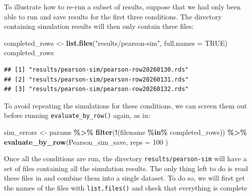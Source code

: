 \documentclass[
]{book}
\newenvironment{Shaded}{\begin{snugshade}}{\end{snugshade}}
\newcommand{\AttributeTok}[1]{\textcolor[rgb]{0.13,0.29,0.53}{#1}}
\newcommand{\ConstantTok}[1]{\textcolor[rgb]{0.56,0.35,0.01}{#1}}
\newcommand{\DecValTok}[1]{\textcolor[rgb]{0.00,0.00,0.81}{#1}}
\newcommand{\FunctionTok}[1]{\textcolor[rgb]{0.13,0.29,0.53}{\textbf{#1}}}
\newcommand{\NormalTok}[1]{#1}
\newcommand{\OtherTok}[1]{\textcolor[rgb]{0.56,0.35,0.01}{#1}}
\newcommand{\SpecialCharTok}[1]{\textcolor[rgb]{0.81,0.36,0.00}{\textbf{#1}}}
\newcommand{\StringTok}[1]{\textcolor[rgb]{0.31,0.60,0.02}{#1}}
\begin{document}
To illustrate how to re-run a subset of results, suppose that we had only been able to run and save results for the first three conditions.
The directory containing simulation results will then only contain three files:

\begin{Shaded}
\begin{Highlighting}[]
\NormalTok{completed\_rows }\OtherTok{\textless{}{-}} \FunctionTok{list.files}\NormalTok{(}\StringTok{"results/pearson{-}sim"}\NormalTok{, }\AttributeTok{full.names =} \ConstantTok{TRUE}\NormalTok{)}
\NormalTok{completed\_rows}
\end{Highlighting}
\end{Shaded}

\begin{verbatim}
## [1] "results/pearson-sim/pearson-row20260130.rds"
## [2] "results/pearson-sim/pearson-row20260131.rds"
## [3] "results/pearson-sim/pearson-row20260132.rds"
\end{verbatim}

To avoid repeating the simulations for these conditions, we can screen them out before running \texttt{evaluate\_by\_row()} again, as in:

\begin{Shaded}
\begin{Highlighting}[]
\NormalTok{sim\_errors }\OtherTok{\textless{}{-}} 
\NormalTok{  params }\SpecialCharTok{\%\textgreater{}\%}
  \FunctionTok{filter}\NormalTok{(}\SpecialCharTok{!}\NormalTok{(filename }\SpecialCharTok{\%in\%}\NormalTok{ completed\_rows)) }\SpecialCharTok{\%\textgreater{}\%}
  \FunctionTok{evaluate\_by\_row}\NormalTok{(Pearson\_sim\_save, }\AttributeTok{reps =} \DecValTok{100}\NormalTok{ )}
\end{Highlighting}
\end{Shaded}

Once all the conditions are run, the directory \texttt{results/pearson-sim} will have a set of files containing all the simulation results.
The only thing left to do is read these files in and combine them into a single dataset.
To do so, we will first get the names of the files with \texttt{list.files()} and check that everything is complete

\begin{Shaded}
\end{Shaded}
\end{document}
